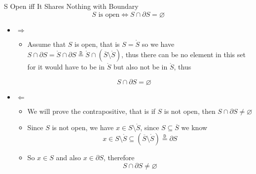 \documentclass{standalone}
\begin{document}
\begin{theo*}{S Open iff It Shares Nothing with Boundary}
  \[
  S \text{ is open} \Leftrightarrow S \cap \partial S = \varnothing
  \]
  \begin{pf}
    \begin{itemize}
      
    \item $ \Rightarrow $ 
      \begin{itemize}
        \item Assume that $ S$ is open, that is $ S = \mathring{S}$ so we have $ S \cap \partial S = \mathring{S} \cap \partial S \stackrel{\mathtt{D}}{=} \mathring{S} \cap \left( \overline{S} \setminus \mathring{S} \right)$, thus there can be no element in this set for it would have to be in $ \mathring{S}$ but also not be in $ \mathring{S}$, thus
      \end{itemize}
      \[
      S \cap \partial S =  \varnothing
      \]
        \item $ \Leftarrow $ 
        \begin{itemize}
          \item We will prove the contrapositive, that is if $ S$ is not open, then $ S \cap \partial S \neq  \varnothing$
          \item Since $ S$  is not open, we have $ x \in S \setminus \mathring{S}$, since $ S \subseteq \overline{S}$ we know
            \[
            x \in S \setminus \mathring{S} \subseteq \left( \overline{S} \setminus \mathring{S} \right) \stackrel{\mathtt{D}}{=} \partial S
            \]
          \item So $ x \in S$ and also $ x \in \partial S$, therefore
            \[
            S \cap \partial S \neq \varnothing
            \]
        \end{itemize}
    \end{itemize}
  \end{pf}
\end{theo*}
\end{document}

